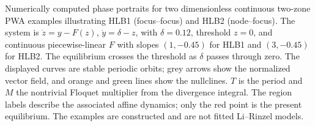 Numerically computed phase portraits for two dimensionless continuous two-zone PWA examples illustrating HLB1 (focus--focus) and HLB2 (node--focus). The system is $\dot z=y-F(z)$, $\dot y=\delta-z$, with $\delta=0.12$, threshold $z=0$, and continuous piecewise-linear $F$ with slopes $(1,-0.45)$ for HLB1 and $(3,-0.45)$ for HLB2. The equilibrium crosses the threshold as $\delta$ passes through zero. The displayed curves are stable periodic orbits; grey arrows show the normalized vector field, and orange and green lines show the nullclines. $T$ is the period and $M$ the nontrivial Floquet multiplier from the divergence integral. The region labels describe the associated affine dynamics; only the red point is the present equilibrium. The examples are constructed and are not fitted Li--Rinzel models.
